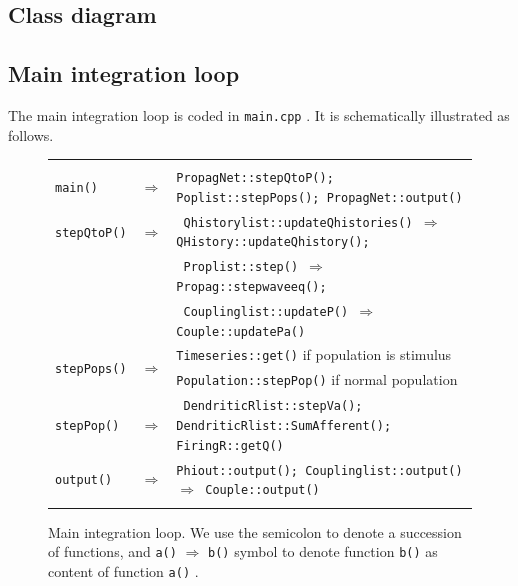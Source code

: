 \documentclass[12pt,a4paper]{article}
\newcommand{\type}[1]{ {\small\small\tt #1} }
\begin{document}
\subsection{Class diagram}

\subsection{Main integration loop}

The main integration loop is coded in \type{main.cpp}. It is schematically illustrated as follows.

\begin{figure}[h!]\begin{center}
\begin{tabular}{ | l l p{12cm} | }
\hline \\

\type{main()}& $\Rightarrow$ &\type{PropagNet::stepQtoP(); Poplist::stepPops(); PropagNet::output() }\\[6pt]

\type{stepQtoP()}& $\Rightarrow$ &
\type{ Qhistorylist::updateQhistories() $\Rightarrow$ QHistory::updateQhistory(); }\\
&&\type{ Proplist::step() $\Rightarrow$ Propag::stepwaveeq(); } \\
&&\type{ Couplinglist::updateP() $\Rightarrow$ Couple::updatePa() }\\[6pt]

\multirow{2}{*}{\type{stepPops()}}&\multirow{2}{*}{$\Rightarrow$}&
\type{Timeseries::get()} if population is stimulus \\
&& \type{Population::stepPop()} if normal population \\[6pt]

\type{stepPop()} & $\Rightarrow$ & \type{ DendriticRlist::stepVa(); DendriticRlist::SumAfferent(); FiringR::getQ() } \\[6pt]

\type{output()}&$\Rightarrow$& \type{Phiout::output(); Couplinglist::output() $\Rightarrow$ Couple::output() }\\

\\\hline
\end{tabular}
\caption{Main integration loop. We use the semicolon to denote a succession of functions, and \type{a()} $\Rightarrow$ \type{b()} symbol to denote function \type{b()} as content of function \type{a()}.}\label{fig:main-loop}
\end{center}\end{figure}
\end{document}
